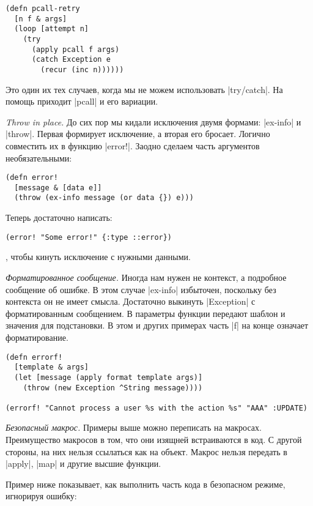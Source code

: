 \begin{verbatim}
(defn pcall-retry
  [n f & args]
  (loop [attempt n]
    (try
      (apply pcall f args)
      (catch Exception e
        (recur (inc n))))))
\end{verbatim}

Это один их тех случаев, когда мы не можем использовать \spverb|try/catch|. На помощь
приходит \spverb|pcall| и его вариации.

\emph{Throw in place.} До сих пор мы кидали исключения двумя формами: \spverb|ex-info| и
\spverb|throw|. Первая формирует исключение, а вторая его бросает. Логично совместить
их в функцию \spverb|error!|. Заодно сделаем часть аргументов необязательными:

\begin{verbatim}
(defn error!
  [message & [data e]]
  (throw (ex-info message (or data {}) e)))
\end{verbatim}

Теперь достаточно написать:

\begin{verbatim}
(error! "Some error!" {:type ::error})
\end{verbatim}

, чтобы кинуть исключение с нужными данными.

\emph{Форматированное сообщение.} Иногда нам нужен не контекст, а подробное
сообщение об ошибке. В этом случае \spverb|ex-info| избыточен, поскольку без контекста
он не имеет смысла. Достаточно выкинуть \spverb|Exception| с форматированным
сообщением. В параметры функции передают шаблон и значения для подстановки. В
этом и других примерах часть \spverb|f| на конце означает форматирование.

\begin{verbatim}
(defn errorf!
  [template & args]
  (let [message (apply format template args)]
    (throw (new Exception ^String message))))

(errorf! "Cannot process a user %s with the action %s" "AAA" :UPDATE)
\end{verbatim}

\emph{Безопасный макрос.} Примеры выше можно переписать на макросах. Преимущество
макросов в том, что они изящней встраиваются в код. С другой стороны, на них
нельзя ссылаться как на объект. Макрос нельзя передать в \spverb|apply|, \spverb|map| и другие
высшие функции.

Пример ниже показывает, как выполнить часть кода в безопасном режиме, игнорируя
ошибку:

